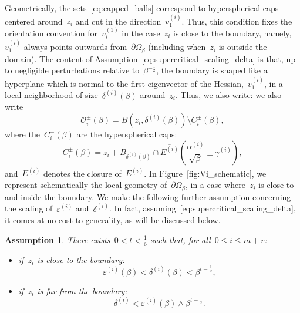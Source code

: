 \documentclass[10pt]{article}
\newcommand{\1}{\mathbbm 1}
\newcommand{\epsBoundary}[1]{\varepsilon^{(#1)}} %
\newcommand{\deltaRadius}[1]{\delta^{(#1)}} %
\newcommand{\epsLimit}[1]{\alpha^{(#1)}} %
\newcommand{\localNeighborhood}[2][]{\mathcal{O}_{#2}^{#1}} %
\newcommand{\localCap}[2][]{C_{#2}^{#1}}
\newcommand{\gammaPerturbation}[1]{\gamma^{(#1)}}
\newcommand{\hessEigvec}[2]{v^{(#1)}_{#2}} %
\newcommand{\halfSpace}[1]{E^{(#1)}}
\newcommand{\scalingExp}{t}
\newtheorem{hypothesis}{Assumption}
\begin{document}
    Geometrically, the sets~\eqref{eq:capped_balls} correspond to hyperspherical caps centered around~$z_i$ and cut in the direction~$\hessEigvec{i}{1}$. Thus, this condition fixes the orientation convention for~$\hessEigvec{1}{i}$ in the case~$z_i$ is close to the boundary, namely,~$\hessEigvec{i}{1}$ always points outwards from~$\partial\Omega_\beta$ (including when~$z_i$ is outside the domain).
    The content of Assumption~\eqref{eq:supercritical_scaling_delta} is that, up to negligible perturbations relative to~$\beta^{-\frac12}$, the boundary is shaped like a hyperplane which is normal to the first eigenvector of the Hessian,~$\hessEigvec{i}{1}$, in a local neighborhood of size~$\deltaRadius{i}(\beta)$ around~$z_i$.
    Thus, we also write:
    we also write
    \begin{equation}
        \localNeighborhood[\pm]{i}(\beta) = B(z_i,\deltaRadius{i}(\beta)) \setminus \localCap[\pm]{i}(\beta),
    \end{equation}
    where the~$\localCap[\pm]{i}(\beta)$ are the hyperspherical caps:
    \begin{equation}
        \label{eq:def_ball_cap}
        \localCap[\pm]{i}(\beta) = z_i + B_{\deltaRadius{i}(\beta)}\cap \overline{\halfSpace{i}}\left(\frac{\epsLimit{i}}{\sqrt\beta}\pm\gammaPerturbation{i}\right),
    \end{equation}
    and~$\overline{\halfSpace{i}}$ denotes the closure of~$\halfSpace{i}$.
    In Figure~\ref{fig:Vi_schematic}, we represent schematically the local geometry of~$\partial\Omega_\beta$, in a case where~$z_i$ is close to and inside the boundary.
    We make the following further assumption concerning the scaling of~$\epsBoundary{i}$ and~$\deltaRadius{i}$. In fact, assuming~\eqref{eq:supercritical_scaling_delta}, it comes at no cost to generality, as will be discussed below.
    \begin{hypothesis}
        There exists~$0<\scalingExp<\frac16$ such that, for all~$0\leq i\leq m+r$:
        
        \begin{itemize}
            \item{if~$z_i$ is close to the boundary:
        \begin{equation}
            \tag{\bf H2}
            \label{eq:deltai_polybound_close}
            \epsBoundary{i}(\beta)<\deltaRadius{i}(\beta) < \beta^{\scalingExp-\frac12},
        \end{equation}}
        
        \item{if~$z_i$ is far from the boundary:
                \begin{equation}
            \tag{\bf H2'}
            \label{eq:deltai_polybound_far}
            \deltaRadius{i}<\epsBoundary{i}(\beta)\land\beta^{\scalingExp-\frac12}.
        \end{equation}}
        \end{itemize}
    \end{hypothesis}
\end{document}
